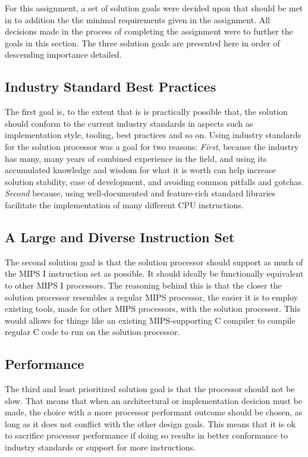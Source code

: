 For this assignment, a set of solution goals were decided upon that should be met in to addition the the minimal requirements given in the assignment.
All decisions made in the process of completing the assignment were to further the goals in this section.
The three solution goals are presented here in order of descending importance detailed.

\subsection{Industry Standard Best Practices}

The first goal is, to the extent that is is practically possible that, the solution should conform to the current industry standards in aspects such as implementation style, tooling, best practices and so on.
Using industry standards for the solution processor was a goal for two reasons:
\textit{First}, because the industry has many, many years of combined experience in the field, and using its accumulated knowledge and wisdom for what it is worth can help increase solution stability, ease of development, and avoiding common pitfalls and gotchas.
\textit{Second} because, using well-documented and feature-rich standard libraries facilitate the implementation of many different CPU instructions.

\subsection{A Large and Diverse Instruction Set}

The second solution goal is that the solution processor should support as much of the MIPS I instruction set as possible.
It should ideally be functionally equivalent to other MIPS I processors.
The reasoning behind this is that the closer the solution processor resembles a regular MIPS processor, the easier it is to employ existing tools, made for other MIPS processors, with the solution processor.
This would allows for things like an existing MIPS-supporting C compiler to compile regular C code to run on the solution processor.

\subsection{Performance}

The third and least prioritized solution goal is that the processor should not be slow.
That means that when an architectural or implementation desicion must be made, the choice with a more processor performant outcome should be chosen, as long as it does not conflict with the other design goals.
This means that it is ok to sacrifice processor performance if doing so results in better conformance to industry standards or support for more instructions.

